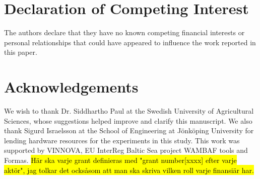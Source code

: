 \documentclass[11pt, review]{elsarticle} %
\begin{document}
\section*{Declaration of Competing Interest}

The authors declare that they have no known competing financial interests or personal relationships that could have appeared to influence the work reported in this paper.

\section*{Acknowledgements}
We wish to thank Dr. Siddhartho Paul at the Swedish University of Agricultural Sciences, whose suggestions helped improve and clarify this manuscript. We also thank Sigurd Israelsson at the School of Engineering at J\"onk\"oping University for lending hardware resources for the experiments in this study. This work was supported by VINNOVA, EU InterReg Baltic Sea project WAMBAF tools and Formas. \hl{ H\"ar ska varje grant definieras med "grant number[xxxx] efter varje akt\"or", jag tolkar det ocks\aa som att man ska skriva vilken roll varje finansi\"ar har.}



\end{document}
